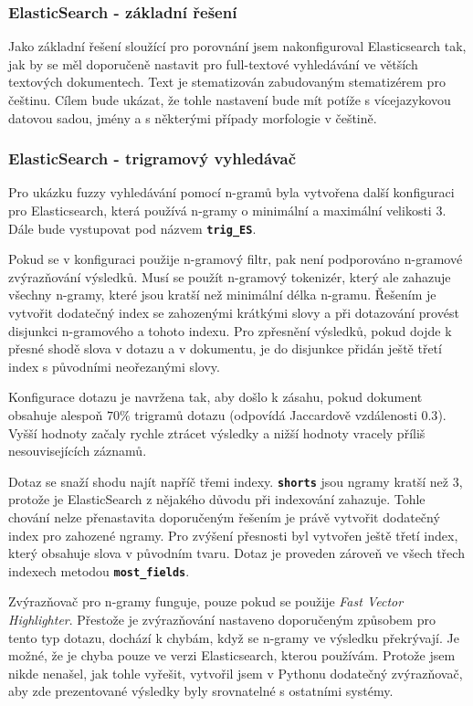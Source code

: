\documentclass[11pt,letterpaper,oneside,openright]{book}
\newcommand{\bftt}[1]{\texttt{\textbf{#1}}}
\begin{document}
\subsubsection{ElasticSearch - základní řešení}
Jako základní řešení sloužící pro porovnání jsem nakonfiguroval Elasticsearch
tak, jak by se měl doporučeně nastavit pro full-textové vyhledávání ve větších
textových dokumentech. Text je stematizován zabudovaným stematizérem pro
češtinu. Cílem bude ukázat, že tohle nastavení bude mít potíže s vícejazykovou
datovou sadou, jmény a s některými případy morfologie v češtině.

\subsubsection{ElasticSearch - trigramový vyhledávač} \label{sec:trigram_implementation}
Pro ukázku fuzzy vyhledávání pomocí n-gramů byla vytvořena další konfiguraci
pro Elasticsearch, která používá n-gramy o minimální a maximální velikosti 3.
Dále bude vystupovat pod názvem \bftt{trig\_ES}.

Pokud se v konfiguraci použije n-gramový filtr, pak není podporováno n-gramové
zvýrazňování výsledků. Musí se použít n-gramový tokenizér, který ale zahazuje
všechny n-gramy, které jsou kratší než minimální délka n-gramu. Řešením je
vytvořit dodatečný index se zahozenými krátkými slovy a při dotazování provést
disjunkci n-gramového a tohoto indexu. Pro zpřesnění výsledků, pokud dojde k
přesné shodě slova v dotazu a v dokumentu, je do disjunkce přidán ještě třetí
index s původními neořezanými slovy.

Konfigurace dotazu je navržena tak, aby došlo k zásahu, pokud dokument obsahuje
alespoň $70\%$ trigramů dotazu (odpovídá Jaccardově vzdálenosti $0.3$). Vyšší
hodnoty začaly rychle ztrácet výsledky a nižší hodnoty vracely příliš
nesouvisejících záznamů.

Dotaz se snaží shodu najít napříč třemi indexy. \bftt{shorts} jsou ngramy
kratší než $3$, protože je ElasticSearch z nějakého důvodu při indexování
zahazuje. Tohle chování nelze přenastavita doporučeným řešením je právě
vytvořit dodatečný index pro zahozené ngramy. Pro zvýšení přesnosti byl
vytvořen ještě třetí index, který obsahuje slova v původním tvaru. Dotaz je
proveden zároveň ve všech třech indexech metodou \bftt{most\_fields}.

Zvýrazňovač pro n-gramy funguje, pouze pokud se použije \textit{Fast Vector
Highlighter}. Přestože je zvýrazňování nastaveno doporučeným způsobem pro tento
typ dotazu, dochází k chybám, když se n-gramy ve výsledku překrývají. Je možné,
že je chyba pouze ve verzi Elasticsearch, kterou používám. Protože jsem nikde
nenašel, jak tohle vyřešit, vytvořil jsem v Pythonu dodatečný zvýrazňovač, aby
zde prezentované výsledky byly srovnatelné s ostatními systémy.
\end{document}
